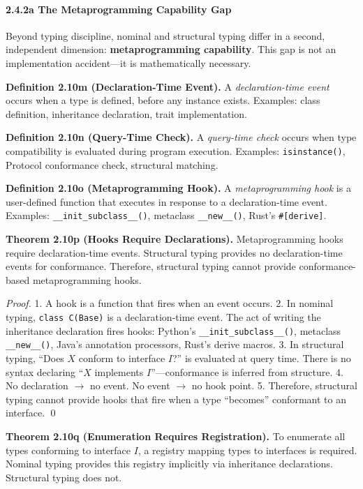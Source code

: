 \paragraph{2.4.2a The Metaprogramming Capability
Gap}\label{a-the-metaprogramming-capability-gap}

Beyond typing discipline, nominal and structural typing differ in a
second, independent dimension: \textbf{metaprogramming capability}. This
gap is not an implementation accident---it is mathematically necessary.

\textbf{Definition 2.10m (Declaration-Time Event).} A
\emph{declaration-time event} occurs when a type is defined, before any
instance exists. Examples: class definition, inheritance declaration,
trait implementation.

\textbf{Definition 2.10n (Query-Time Check).} A \emph{query-time check}
occurs when type compatibility is evaluated during program execution.
Examples: \texttt{isinstance()}, Protocol conformance check, structural
matching.

\textbf{Definition 2.10o (Metaprogramming Hook).} A
\emph{metaprogramming hook} is a user-defined function that executes in
response to a declaration-time event. Examples:
\texttt{\_\_init\_subclass\_\_()}, metaclass \texttt{\_\_new\_\_()},
Rust's \texttt{\#{[}derive{]}}.

\textbf{Theorem 2.10p (Hooks Require Declarations).} Metaprogramming
hooks require declaration-time events. Structural typing provides no
declaration-time events for conformance. Therefore, structural typing
cannot provide conformance-based metaprogramming hooks.

\emph{Proof.} 1. A hook is a function that fires when an event occurs.
2. In nominal typing, \texttt{class\ C(Base)} is a declaration-time
event. The act of writing the inheritance declaration fires hooks:
Python's \texttt{\_\_init\_subclass\_\_()}, metaclass
\texttt{\_\_new\_\_()}, Java's annotation processors, Rust's derive
macros. 3. In structural typing, ``Does \(X\) conform to interface
\(I\)?'' is evaluated at query time. There is no syntax declaring
``\(X\) implements \(I\)''---conformance is inferred from structure. 4.
No declaration $\rightarrow$ no event. No event $\rightarrow$ no hook point. 5. Therefore,
structural typing cannot provide hooks that fire when a type ``becomes''
conformant to an interface. \qed

\textbf{Theorem 2.10q (Enumeration Requires Registration).} To enumerate
all types conforming to interface \(I\), a registry mapping types to
interfaces is required. Nominal typing provides this registry implicitly
via inheritance declarations. Structural typing does not.


